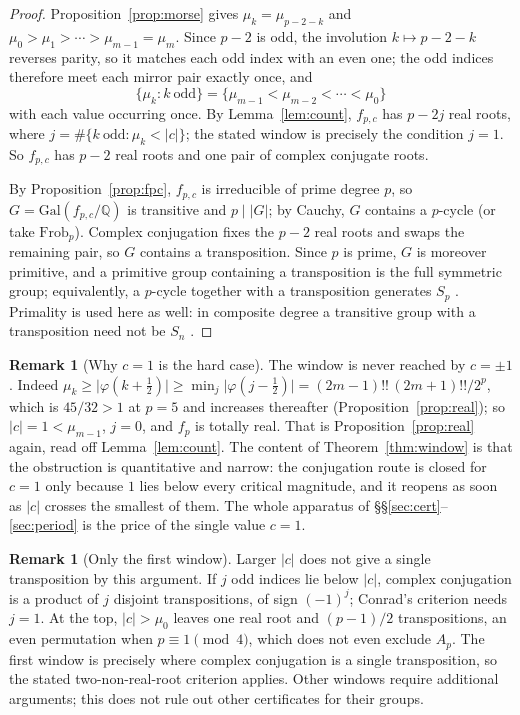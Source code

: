 \documentclass[11pt,a4paper]{amsart}
\newcommand{\Q}{\mathbb{Q}}
\newcommand{\Gal}{\mathrm{Gal}}
\newcommand{\Frob}{\mathrm{Frob}}
\theoremstyle{plain}
\theoremstyle{definition}
\newtheorem{remark}[theorem]{Remark}
\begin{document}
\begin{proof}
Proposition~\ref{prop:morse} gives \(\mu_k=\mu_{p-2-k}\) and \(\mu_0>\mu_1>\cdots>\mu_{m-1}=\mu_m\). Since \(p-2\) is odd, the involution \(k\mapsto p-2-k\) reverses parity, so it matches each odd index with an even one; the odd indices therefore meet each mirror pair exactly once, and
\[
\{\mu_k:k\ \text{odd}\}=\{\mu_{m-1}<\mu_{m-2}<\cdots<\mu_0\}
\]
with each value occurring once. By Lemma~\ref{lem:count}, \(f_{p,c}\) has \(p-2j\) real roots, where \(j=\#\{k\ \text{odd}:\mu_k<\lvert c\rvert\}\); the stated window is precisely the condition \(j=1\). So \(f_{p,c}\) has \(p-2\) real roots and one pair of complex conjugate roots.

By Proposition~\ref{prop:fpc}, \(f_{p,c}\) is irreducible of prime degree \(p\), so \(G=\Gal(f_{p,c}/\Q)\) is transitive and \(p\mid\lvert G\rvert\); by Cauchy, \(G\) contains a \(p\)-cycle (or take \(\Frob_p\)). Complex conjugation fixes the \(p-2\) real roots and swaps the remaining pair, so \(G\) contains a transposition. Since \(p\) is prime, \(G\) is moreover primitive, and a primitive group containing a transposition is the full symmetric group; equivalently, a \(p\)-cycle together with a transposition generates \(S_p\) \cite[Thm.~3.2]{ConradPerm}. Primality is used here as well: in composite degree a transitive group with a transposition need not be \(S_n\) \cite[Rem.~3.3]{ConradPerm}.
\end{proof}

\begin{remark}[Why \(c=1\) is the hard case]
\label{rem:c1}
The window is never reached by \(c=\pm1\). Indeed \(\mu_k\ge\lvert\varphi(k+\tfrac12)\rvert\ge\min_j\lvert\varphi(j-\tfrac12)\rvert=(2m-1)!!\,(2m+1)!!/2^{p}\), which is \(45/32>1\) at \(p=5\) and increases thereafter (Proposition~\ref{prop:real}); so \(\lvert c\rvert=1<\mu_{m-1}\), \(j=0\), and \(f_p\) is totally real. That is Proposition~\ref{prop:real} again, read off Lemma~\ref{lem:count}. The content of Theorem~\ref{thm:window} is that the obstruction is quantitative and narrow: the conjugation route is closed for \(c=1\) only because \(1\) lies below every critical magnitude, and it reopens as soon as \(\lvert c\rvert\) crosses the smallest of them. The whole apparatus of \S\S\ref{sec:cert}--\ref{sec:period} is the price of the single value \(c=1\).
\end{remark}

\begin{remark}[Only the first window]
\label{rem:firstwindow}
Larger \(\lvert c\rvert\) does not give a single transposition by this argument. If \(j\) odd indices lie below \(\lvert c\rvert\), complex conjugation is a product of \(j\) disjoint transpositions, of sign \((-1)^j\); Conrad's criterion needs \(j=1\). At the top, \(\lvert c\rvert>\mu_0\) leaves one real root and \((p-1)/2\) transpositions, an even permutation when \(p\equiv1\pmod4\), which does not even exclude \(A_p\). The first window is precisely where complex conjugation is a single transposition, so the stated two-non-real-root criterion applies. Other windows require additional arguments; this does not rule out other certificates for their groups.
\end{remark}
\end{document}
